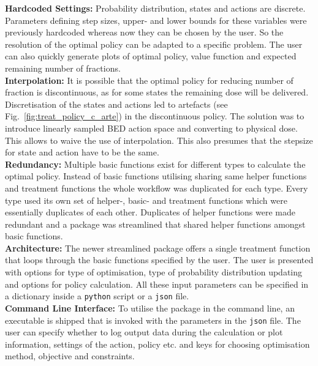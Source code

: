 \documentclass[\relativeRoot/ada.tex]{subfiles}
\begin{document}
\textbf{Hardcoded Settings:} Probability distribution, states and actions are discrete. Parameters defining step sizes, upper- and lower bounds for these variables were previously hardcoded whereas now they can be chosen by the user. So the resolution of the optimal policy can be adapted to a specific problem. The user can also quickly generate plots of optimal policy, value function and expected remaining number of fractions.\\

\textbf{Interpolation:} It is possible that the optimal policy for reducing number of fraction is discontinuous, as for some states the remaining dose will be delivered. Discretisation of the states and actions led to artefacts (see Fig.~\ref{fig:treat_policy_c_arte}) in the discontinuous policy. The solution was to introduce linearly sampled BED action space and converting to physical dose. This allows to waive the use of interpolation. This also presumes that the stepsize for state and action have to be the same.\\

\textbf{Redundancy:} Multiple basic functions exist for different types to calculate the optimal policy. Instead of basic functions utilising sharing same helper functions and treatment functions the whole workflow was duplicated for each type. Every type used its own set of helper-, basic- and treatment functions which were essentially duplicates of each other. Duplicates of helper functions were made redundant and a package was streamlined that shared helper functions amongst basic functions.\\

\textbf{Architecture:} The newer streamlined package offers a single treatment function that loops through the basic functions specified by the user. The user is presented with options for type of optimisation, type of probability distribution updating and options for policy calculation. All these input parameters can be specified in a dictionary inside a \texttt{python} script or a \texttt{json} file.\\

\textbf{Command Line Interface:} To utilise the package in the command line, an executable is shipped that is invoked with the parameters in the \texttt{json} file. The user can specify whether to log output data during the calculation or plot information, settings of the action, policy etc. and keys for choosing optimisation method, objective  and constraints.\\
\end{document}
